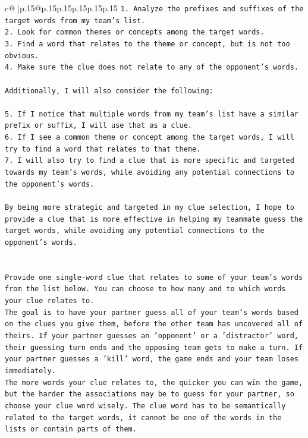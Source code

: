 \documentclass{article}
\begin{document}
{\begin{supertabular}{c@{$\;$}|p{.15\linewidth}@{}p{.15\linewidth}p{.15\linewidth}p{.15\linewidth}p{.15\linewidth}p{.15\linewidth}}
{{{\texttt{1. Analyze the prefixes and suffixes of the target words from my team's list.} \\
\texttt{2. Look for common themes or concepts among the target words.} \\
\texttt{3. Find a word that relates to the theme or concept, but is not too obvious.} \\
\texttt{4. Make sure the clue does not relate to any of the opponent's words.} \\
\\ 
\texttt{Additionally, I will also consider the following:} \\
\\ 
\texttt{5. If I notice that multiple words from my team's list have a similar prefix or suffix, I will use that as a clue.} \\
\texttt{6. If I see a common theme or concept among the target words, I will try to find a word that relates to that theme.} \\
\texttt{7. I will also try to find a clue that is more specific and targeted towards my team's words, while avoiding any potential connections to the opponent's words.} \\
\\ 
\texttt{By being more strategic and targeted in my clue selection, I hope to provide a clue that is more effective in helping my teammate guess the target words, while avoiding any potential connections to the opponent's words.} \\
\\ 
\\ 
\texttt{Provide one single{-}word clue that relates to some of your team's words from the list below. You can choose to how many and to which words your clue relates to.} \\
\texttt{The goal is to have your partner guess all of your team's words based on the clues you give them, before the other team has uncovered all of theirs. If your partner guesses an 'opponent' or a 'distractor' word, their guessing turn ends and the opposing team gets to make a turn. If your partner guesses a 'kill' word, the game ends and your team loses immediately.} \\
\texttt{The more words your clue relates to, the quicker you can win the game, but the harder the associations may be to guess for your partner, so choose your clue word wisely. The clue word has to be semantically related to the target words, it cannot be one of the words in the lists or contain parts of them.} \\
}}}
\end{supertabular}}
\end{document}
